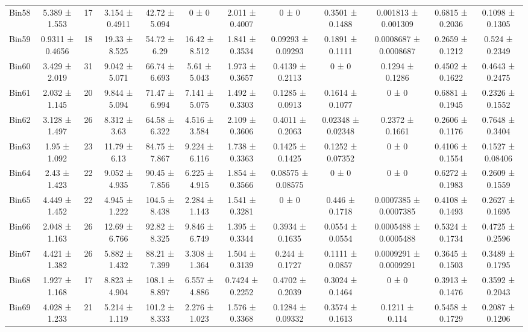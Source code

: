 \begin{tabular}{@{\extracolsep{4pt}}lccccccccccc@{}}
     Bin58 & 5.389 ± 1.553 & 17 & 3.154 ± 0.4911 & 42.72 ± 5.094 & 0 ± 0 & 2.011 ± 0.4007 & 0 ± 0 & 0.3501 ± 0.1488 & 0.001813 ± 0.001309 & 0.6815 ± 0.2036 & 0.1098 ± 0.1305 \\ 
     Bin59 & 0.9311 ± 0.4656 & 18 & 19.33 ± 8.525 & 54.72 ± 6.29 & 16.42 ± 8.512 & 1.841 ± 0.3534 & 0.09293 ± 0.09293 & 0.1891 ± 0.1111 & 0.0008687 ± 0.0008687 & 0.2659 ± 0.1212 & 0.524 ± 0.2349 \\ 
     Bin60 & 3.429 ± 2.019 & 31 & 9.042 ± 5.071 & 66.74 ± 6.693 & 5.61 ± 5.043 & 1.973 ± 0.3657 & 0.4139 ± 0.2113 & 0 ± 0 & 0.1294 ± 0.1286 & 0.4502 ± 0.1622 & 0.4643 ± 0.2475 \\ 
     Bin61 & 2.032 ± 1.145 & 20 & 9.844 ± 5.094 & 71.47 ± 6.994 & 7.141 ± 5.075 & 1.492 ± 0.3303 & 0.1285 ± 0.0913 & 0.1614 ± 0.1077 & 0 ± 0 & 0.6881 ± 0.1945 & 0.2326 ± 0.1552 \\ 
     Bin62 & 3.128 ± 1.497 & 26 & 8.312 ± 3.63 & 64.58 ± 6.322 & 4.516 ± 3.584 & 2.109 ± 0.3606 & 0.4011 ± 0.2063 & 0.02348 ± 0.02348 & 0.2372 ± 0.1661 & 0.2606 ± 0.1176 & 0.7648 ± 0.3404 \\ 
     Bin63 & 1.95 ± 1.092 & 23 & 11.79 ± 6.13 & 84.75 ± 7.867 & 9.224 ± 6.116 & 1.738 ± 0.3363 & 0.1425 ± 0.1425 & 0.1252 ± 0.07352 & 0 ± 0 & 0.4106 ± 0.1554 & 0.1527 ± 0.08406 \\ 
     Bin64 & 2.43 ± 1.423 & 22 & 9.052 ± 4.935 & 90.45 ± 7.856 & 6.225 ± 4.915 & 1.854 ± 0.3566 & 0.08575 ± 0.08575 & 0 ± 0 & 0 ± 0 & 0.6272 ± 0.1983 & 0.2609 ± 0.1559 \\ 
     Bin65 & 4.449 ± 1.452 & 22 & 4.945 ± 1.222 & 104.5 ± 8.438 & 2.284 ± 1.143 & 1.541 ± 0.3281 & 0 ± 0 & 0.446 ± 0.1718 & 0.0007385 ± 0.0007385 & 0.4108 ± 0.1493 & 0.2627 ± 0.1695 \\ 
     Bin66 & 2.048 ± 1.163 & 26 & 12.69 ± 6.766 & 92.82 ± 8.325 & 9.846 ± 6.749 & 1.395 ± 0.3344 & 0.3934 ± 0.1635 & 0.0554 ± 0.0554 & 0.0005488 ± 0.0005488 & 0.5324 ± 0.1734 & 0.4725 ± 0.2596 \\ 
     Bin67 & 4.421 ± 1.382 & 26 & 5.882 ± 1.432 & 88.21 ± 7.399 & 3.308 ± 1.364 & 1.504 ± 0.3139 & 0.244 ± 0.1727 & 0.1111 ± 0.0857 & 0.0009291 ± 0.0009291 & 0.3645 ± 0.1503 & 0.3489 ± 0.1795 \\ 
     Bin68 & 1.927 ± 1.168 & 17 & 8.823 ± 4.904 & 108.1 ± 8.897 & 6.557 ± 4.886 & 0.7424 ± 0.2252 & 0.4702 ± 0.2039 & 0.3024 ± 0.1464 & 0 ± 0 & 0.3913 ± 0.1476 & 0.3592 ± 0.2043 \\ 
     Bin69 & 4.028 ± 1.233 & 21 & 5.214 ± 1.119 & 101.2 ± 8.333 & 2.276 ± 1.023 & 1.576 ± 0.3368 & 0.1284 ± 0.09332 & 0.3574 ± 0.1613 & 0.1211 ± 0.114 & 0.5458 ± 0.1729 & 0.2087 ± 0.1206 \\ 

\end{tabular}
